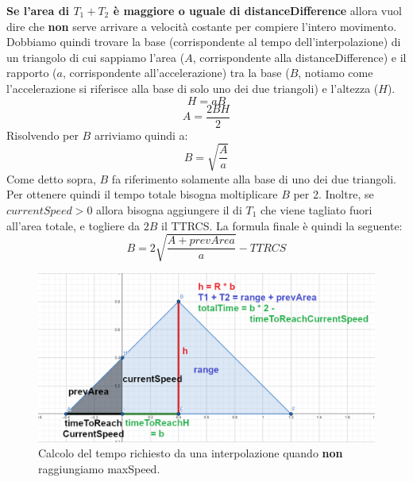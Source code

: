 \documentclass[main.tex]{subfiles}
\begin{document}
\textbf{Se l'area di $T_1 + T_2$ è maggiore o uguale di distanceDifference} allora vuol dire che \textbf{non} serve arrivare a velocità costante per compiere l'intero movimento. Dobbiamo quindi trovare la base (corrispondente al tempo dell'interpolazione) di un triangolo di cui sappiamo l'area ($A$, corrispondente alla distanceDifference) e il rapporto ($a$, corrispondente all'accelerazione) tra la base ($B$, notiamo come l'accelerazione si riferisce alla base di solo uno dei due triangoli) e l'altezza ($H$).
\[H = aB\]
\[A = \frac{2BH}{2}\]
Risolvendo per $B$ arriviamo quindi a:
\[B = \sqrt{\frac{A}{a}}\]
\clearpage
Come detto sopra, $B$ fa riferimento solamente alla base di uno dei due triangoli. Per ottenere quindi il tempo totale bisogna moltiplicare $B$ per 2. Inoltre, se $currentSpeed > 0$ allora bisogna aggiungere il  di $T_1$ che viene tagliato fuori all'area totale, e togliere da $2B$ il TTRCS. La formula finale è quindi la seguente:
\[B = 2\sqrt{\frac{A + prevArea}{a}} - TTRCS\]
\begin{figure}[H]
    \centering
    \includegraphics[width=1\linewidth]{img/interpolazione/speedCapNoMaxSpeedCalcSplice.png}
    \caption{Calcolo del tempo richiesto da una interpolazione quando \textbf{non} raggiungiamo maxSpeed.}
    \label{fig:4_speedCapNoMaxSpeedCalcSplice}
\end{figure}
\end{document}
